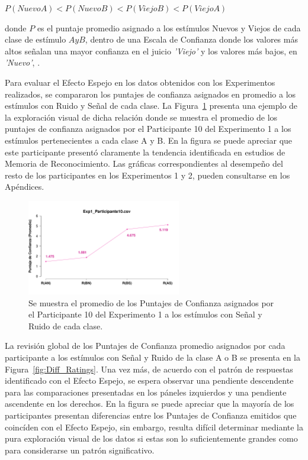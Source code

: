 \begin{center}
$P(NuevoA) < P(NuevoB) < P(ViejoB) < P(ViejoA)$\\
\end{center}
\begin{center}
donde $P$ es el puntaje promedio asignado a los estímulos Nuevos y Viejos de cada clase de estímulo $A y B$, dentro de una Escala de Confianza donde los valores más altos señalan una mayor confianza en el juicio \textit{'Viejo'} y los valores más bajos, en \textit{'Nuevo'}, \parencite{Glanzer1993}.\\
\end{center}

Para evaluar el Efecto Espejo en los datos obtenidos con los Experimentos realizados, se compararon los puntajes de confianza asignados en promedio a los estímulos con Ruido y Señal de cada clase. La Figura~\ref{fig:MirrorRating_E1_P10} presenta una ejemplo de la exploración visual de dicha relación donde se muestra el promedio de los puntajes de confianza asignados por el Participante 10 del Experimento 1 a los estímulos pertenecientes a cada clase A y B. En la figura se puede apreciar que este participante presentó claramente la tendencia identificada en estudios de Memoria de Reconocimiento. Las gráficas correspondientes al desempeño del resto de los participantes en los Experimentos 1 y 2, pueden consultarse en los Apéndices.\\

\begin{figure}[th]
\centering
\includegraphics[width=0.60\textwidth]{Figures/MirrorRating_Exp1_P10}
\caption[Comparación entre Puntajes de Confianza asignados por Clase; Ejemplo]{Se muestra el promedio de los Puntajes de Confianza asignados por el Participante 10 del Experimento 1 a los estímulos con Señal y Ruido de cada clase.}
\label{fig:MirrorRating_E1_P10}
\end{figure}

La revisión global de los Puntajes de Confianza promedio asignados por cada participante a los estímulos con Señal y Ruido de la clase A o B se presenta en la Figura~\ref{fig:Diff_Ratings}. Una vez más, de acuerdo con el patrón de respuestas identificado con el Efecto Espejo, se espera observar una pendiente descendente para las comparaciones presentadas en los páneles izquierdos y una pendiente ascendente en los derechos. En la figura se puede apreciar que la mayoría de los participantes presentan diferencias entre los Puntajes de Confianza emitidos que coincíden con el Efecto Espejo, sin embargo, resulta difícil determinar mediante la pura exploración visual de los datos si estas son lo suficientemente grandes como para considerarse un patrón significativo.\\

